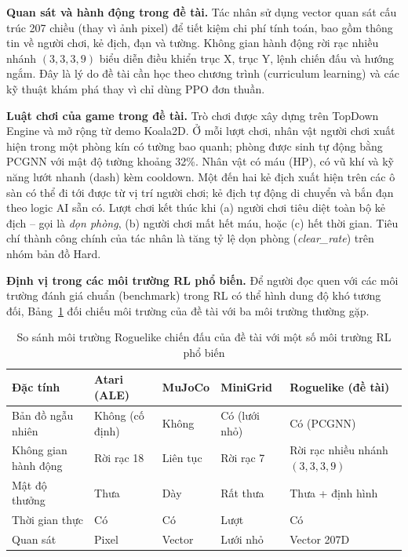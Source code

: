 \textbf{Quan sát và hành động trong đề tài.} Tác nhân sử dụng vector quan sát cấu trúc 207 chiều (thay vì ảnh pixel) để tiết kiệm chi phí tính toán, bao gồm thông tin về người chơi, kẻ địch, đạn và tường. Không gian hành động rời rạc nhiều nhánh $(3,3,3,9)$ biểu diễn điều khiển trục X, trục Y, lệnh chiến đấu và hướng ngắm. Đây là lý do đề tài cần học theo chương trình (curriculum learning) và các kỹ thuật khám phá thay vì chỉ dùng PPO đơn thuần.

\textbf{Luật chơi của game trong đề tài.} Trò chơi được xây dựng trên TopDown Engine và mở rộng từ demo Koala2D. Ở mỗi lượt chơi, nhân vật người chơi xuất hiện trong một phòng kín có tường bao quanh; phòng được sinh tự động bằng PCGNN với mật độ tường khoảng 32\%. Nhân vật có máu (HP), có vũ khí và kỹ năng lướt nhanh (dash) kèm cooldown. Một đến hai kẻ địch xuất hiện trên các ô sàn có thể đi tới được từ vị trí người chơi; kẻ địch tự động di chuyển và bắn đạn theo logic AI sẵn có. Lượt chơi kết thúc khi (a) người chơi tiêu diệt toàn bộ kẻ địch -- gọi là \emph{dọn phòng}, (b) người chơi mất hết máu, hoặc (c) hết thời gian. Tiêu chí thành công chính của tác nhân là tăng tỷ lệ dọn phòng (\emph{clear\_rate}) trên nhóm bản đồ Hard.

\textbf{Định vị trong các môi trường RL phổ biến.} Để người đọc quen với các môi trường đánh giá chuẩn (benchmark) trong RL có thể hình dung độ khó tương đối, Bảng~\ref{tab:rl_env_comparison} đối chiếu môi trường của đề tài với ba môi trường thường gặp.

\begin{table}[H]
    \centering
    \small
    \caption{So sánh môi trường Roguelike chiến đấu của đề tài với một số môi trường RL phổ biến}
    \label{tab:rl_env_comparison}
    \begin{tabular}{|p{3.2cm}|p{2.6cm}|p{2.6cm}|p{2.4cm}|p{2.8cm}|}
        \hline
        \textbf{Đặc tính} & \textbf{Atari (ALE)} & \textbf{MuJoCo} & \textbf{MiniGrid} & \textbf{Roguelike (đề tài)} \\
        \hline
        Bản đồ ngẫu nhiên & Không (cố định) & Không & Có (lưới nhỏ) & Có (PCGNN) \\
        \hline
        Không gian hành động & Rời rạc 18 & Liên tục & Rời rạc 7 & Rời rạc nhiều nhánh $(3,3,3,9)$ \\
        \hline
        Mật độ thưởng & Thưa & Dày & Rất thưa & Thưa + định hình \\
        \hline
        Thời gian thực & Có & Có & Lượt & Có \\
        \hline
        Quan sát & Pixel & Vector & Lưới nhỏ & Vector 207D \\
        \hline
    \end{tabular}
\end{table}

